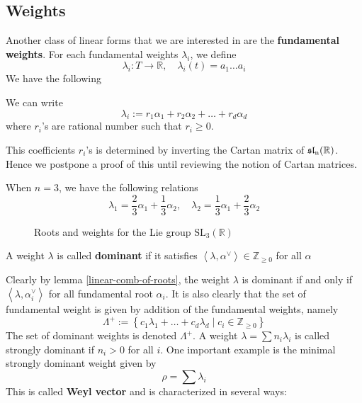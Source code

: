 \subsection{Weights}
Another class of linear forms that we are interested in are the \textbf{fundamental weights}. For each fundamental
weights $\lambda_i$, we define
\[\lambda_i \colon T \to \mathbb{R}, \quad\lambda_i(t) = a_1\ldots a_i\]
We have the following
\begin{lemma}\label{linear-comb-of-weights}
    We can write
    \[\lambda_i := r_1\alpha_1 + r_2\alpha_2+\ldots + r_d\alpha_d\]
    where $r_i$'s are rational number such that $r_i \ge 0$.
\end{lemma}
This coefficients $r_i$'s is determined by inverting the Cartan matrix of $\operatorname{\mathfrak{sl}_n(\mathbb{R})}$. Hence we postpone a proof
of this until reviewing the notion of Cartan matrices.
\begin{example}
    When $n=3$, we have the following relations 
    \[\lambda_1 = \dfrac{2}{3}\alpha_1+\dfrac{1}{3}\alpha_2, \quad \lambda_2 = \dfrac{1}{3}\alpha_1+\dfrac{2}{3}\alpha_2\]
\end{example}
\begin{figure}[h]
    \centering
    \caption{Roots and weights for the Lie group $\text{SL}_3(\mathbb{R})$}
\end{figure}


\begin{definition}
    A weight $\lambda$ is called \textbf{dominant} if it satisfies $\left\langle \lambda,\alpha^{\vee} \right\rangle \in \mathbb{Z}_{\ge 0}$ for all $\alpha$
\end{definition}
Clearly by lemma \ref{linear-comb-of-roots}, the weight $\lambda$ is dominant if and only if $\left\langle\lambda,\alpha_i^\vee\right\rangle$ for all
fundamental root $\alpha_i$. It is also clearly that the set of fundamental weight is given by addition of the fundamental weights, namely
\[\Lambda^+ := \left\lbrace c_1\lambda_1+\ldots+c_d\lambda_d \mid c_i \in \mathbb{Z}_{\ge 0}\right\rbrace\]
The set of dominant weights is denoted $\Lambda^+$. A weight $\lambda = \sum n_i \lambda_i$ is called strongly dominant if $n_i > 0$ for all $i$. One important example is the minimal strongly dominant weight given by
\[
    \rho = \sum \lambda_i
\]
This is called \textbf{Weyl vector} and is characterized in several ways:

